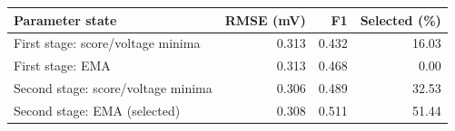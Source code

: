 \begin{tabularx}{\textwidth}{Xrrr}
\toprule
Parameter state & RMSE (mV) & F1 & Selected (\%)\\
\midrule
First stage: score/voltage minima & 0.313 & 0.432 & 16.03\\
First stage: EMA & 0.313 & 0.468 & 0.00\\
Second stage: score/voltage minima & 0.306 & 0.489 & 32.53\\
Second stage: EMA (selected) & 0.308 & 0.511 & 51.44\\
\bottomrule
\end{tabularx}
